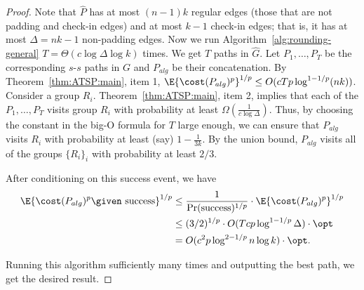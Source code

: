 \documentclass[11pt,a4paper]{article}
\begin{document}
\begin{proof}
Note that $\hat P$ has at most $(n-1)k$ regular edges (those that are not padding and check-in edges) and at most $k-1$ check-in edges; that is, it has at most $\Delta = nk-1$ non-padding edges.
Now we run Algorithm~\ref{alg:rounding-general}  $T = \Theta(c\log \Delta\log k)$ times. We get $T$ paths in $\hat G$. Let $P_1,\dots, P_T$ be the corresponding $s$-$s$ paths in $G$ and $P_{alg}$ be their concatenation. By Theorem~\ref{thm:ATSP:main}, item 1, $\E{\cost(P_{alg})^p}^{1/p}\leq O(c T p \log^{1-1/p} (nk))$.
Consider a group $R_i$. Theorem~\ref{thm:ATSP:main}, item 2, implies that each of the \(P_1, \ldots, P_T\) visits group $R_i$ with probability at least $\Omega({\frac{1}{c\log \Delta}})$. Thus, by choosing the constant in the big-O formula for \(T\) large enough, we can ensure that \(P_{alg}\) visits $R_i$ with probability at least (say) $1 - \frac{1}{3k}$. 
By the union bound, \(P_{alg}\) visits all of the groups $\{R_i\}_{i}$ with probability at least $2/3$.

After conditioning on this success event, we have
\begin{align*}
    \E{\cost(P_{alg})^p\given \text{ success}}^{1/p} &\le \frac{1}{\Pr(\text{success})^{1/p}} \cdot \E{\cost(P_{alg})^p}^{1/p} \\ 
    &\leq  (3/2)^{1/p} \cdot O(T c p \log^{1-1/p} \Delta) \cdot \opt 
    \\&= %
 O(c^2 p  \log^{2-1/p} n \log k) \cdot \opt.
\end{align*}

Running this algorithm sufficiently many times and outputting the best path, we get the desired result.
\end{proof}
\end{document}
